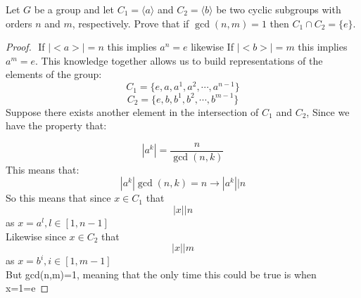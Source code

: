 \documentclass[11pt]{article}
\theoremstyle{definition}  %
\newcommand{\block}[2]{\begin{tcolorbox}[title={#1}]{#2}\end{tcolorbox}}
\begin{document}
\block{Question 7}{
Let $G$ be a group and let $C_1 = \langle a \rangle$ and $C_2 = \langle b \rangle$ be two cyclic subgroups with orders $n$ and $m$, respectively.
 Prove that if $\gcd(n,m) = 1$ then $C_1 \cap C_2 = \{e\}$.
 }
 \begin{proof}
   $ $\newline
  If $|<a>|=n$ this implies $a^n=e$ likewise   If $|<b>|=m$ this implies $a^m=e$. This knowledge together allows us to build representations of the elements of the group:
  \[
    C_1=\{e, a, a^1,a^2,\cdots, a^{n-1}\}
  \]
  \[
    C_2=\{e, b, b^1,b^2,\cdots, b^{m-1}\}
  \]
  Suppose there exists another element in the intersection of $C_1$ and $C_2$, 
   Since we have the property that:

   \[
     |a^k|=\frac{n}{\gcd(n,k)}
   \]
   This means that:
   \[
     |a^k|\gcd(n,k)=n\rightarrow |a^k||n
   \]
  So this means that since $x\in C_1$ that $$|x||n$$ as $x=a^l,l\in[1,n-1]$\\
  Likewise since $x\in C_2$ that $$|x||m$$ as $x=b^i,i\in[1,m-1]$\\
  But gcd(n,m)=1, meaning that the only time this could be true is when x=1=e
 \end{proof}
\end{document}
